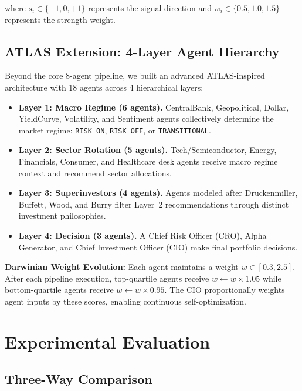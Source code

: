 \documentclass[conference]{IEEEtran}
\begin{document}
\noindent where $s_i \in \{-1, 0, +1\}$ represents the signal direction and $w_i \in \{0.5, 1.0, 1.5\}$ represents the strength weight.

\subsection{ATLAS Extension: 4-Layer Agent Hierarchy}

Beyond the core 8-agent pipeline, we built an advanced ATLAS-inspired architecture with 18 agents across 4 hierarchical layers:

\begin{itemize}
\item \textbf{Layer 1: Macro Regime (6 agents).} CentralBank, Geopolitical, Dollar, YieldCurve, Volatility, and Sentiment agents collectively determine the market regime: \texttt{RISK\_ON}, \texttt{RISK\_OFF}, or \texttt{TRANSITIONAL}.
\item \textbf{Layer 2: Sector Rotation (5 agents).} Tech/Semiconductor, Energy, Financials, Consumer, and Healthcare desk agents receive macro regime context and recommend sector allocations.
\item \textbf{Layer 3: Superinvestors (4 agents).} Agents modeled after Druckenmiller, Buffett, Wood, and Burry filter Layer~2 recommendations through distinct investment philosophies.
\item \textbf{Layer 4: Decision (3 agents).} A Chief Risk Officer (CRO), Alpha Generator, and Chief Investment Officer (CIO) make final portfolio decisions.
\end{itemize}

\textbf{Darwinian Weight Evolution:} Each agent maintains a weight $w \in [0.3, 2.5]$. After each pipeline execution, top-quartile agents receive $w \leftarrow w \times 1.05$ while bottom-quartile agents receive $w \leftarrow w \times 0.95$. The CIO proportionally weights agent inputs by these scores, enabling continuous self-optimization.


\section{Experimental Evaluation}
\label{sec:evaluation}

\subsection{Three-Way Comparison}
\end{document}
